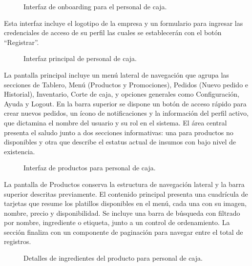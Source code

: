 \begin{figure}[H]
    \centering
    
    \caption{Interfaz de onboarding para el personal de caja.}
    \label{fig:ui-caj-01-a}
\end{figure}

Esta interfaz incluye el logotipo de la empresa y un formulario para ingresar las credenciales de acceso de su perfil las cuales se establecerán con el botón ``Registrar''.

\begin{figure}[H]
    \centering
    
    \caption{Interfaz principal de personal de caja.}
    \label{fig:ui-caj-02}
\end{figure}

La pantalla principal incluye un menú lateral de navegación que agrupa las secciones de Tablero, Menú (Productos y Promociones), Pedidos (Nuevo pedido e Historial), Inventario, Corte de caja, y opciones generales como Configuración, Ayuda y Logout. En la barra superior se dispone un botón de acceso rápido para crear nuevos pedidos, un ícono de notificaciones y la información del perfil activo, que dictamina el nombre del usuario y su rol en el sistema. El área central presenta el saludo junto a dos secciones informativas: una para productos no disponibles y otra que describe el estatus actual de insumos con bajo nivel de existencia.

\begin{figure}[H]
    \centering
    
    \caption{Interfaz de productos para personal de caja.}
    \label{fig:ui-caj-03}
\end{figure}

La pantalla de Productos conserva la estructura de navegación lateral y la barra superior descritas previamente. El contenido principal presenta una cuadrícula de tarjetas que resume los platillos disponibles en el menú, cada una con su imagen, nombre, precio y disponibilidad. Se incluye una barra de búsqueda con filtrado por nombre, ingrediente o etiqueta, junto a un control de ordenamiento. La sección finaliza con un componente de paginación para navegar entre el total de registros.

\begin{figure}[H]
    \centering
    
    \caption{Detalles de ingredientes del producto para personal de caja.}
    \label{fig:ui-caj-04}
\end{figure}

